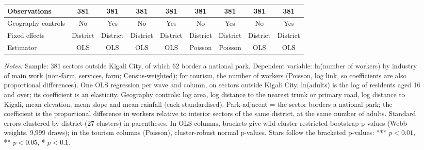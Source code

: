 \documentclass[11pt]{article}
\begin{document}
\begin{table}[H]
{\begin{tabular}{lcccccccc}
Observations & 381 & 381 & 381 & 381 & 381 & 381 & 381 & 381 \\
\midrule
Geography controls & No & Yes & No & Yes & No & Yes & No & Yes \\
Fixed effects & District & District & District & District & District & District & District & District \\
Estimator & OLS & OLS & OLS & OLS & Poisson & Poisson & OLS & OLS \\
\bottomrule
\end{tabular}}
\begin{minipage}{0.97\textwidth}\scriptsize
\textit{Notes:} Sample: 381 sectors outside Kigali City, of which 62 border a national park. Dependent variable: ln(number of workers) by industry of main work (non-farm, services, farm; Census-weighted); for tourism, the number of workers (Poisson, log link, so coefficients are also proportional differences). One OLS regression per wave and column, on sectors outside Kigali City. ln(adults) is the log of residents aged 16 and over; its coefficient is an elasticity. Geography controls: log area, log distance to the nearest trunk or primary road, log distance to Kigali, mean elevation, mean slope and mean rainfall (each standardised). Park-adjacent = the sector borders a national park; the coefficient is the proportional difference in workers relative to interior sectors of the same district, at the same number of adults. Standard errors clustered by district (27 clusters) in parentheses. In OLS columns, brackets give wild cluster restricted bootstrap p-values (Webb weights, 9,999 draws); in the tourism columns (Poisson), cluster-robust normal p-values. Stars follow the bracketed p-values: *** $p<0.01$, ** $p<0.05$, * $p<0.1$.
\end{minipage}
\end{table}
\end{document}
